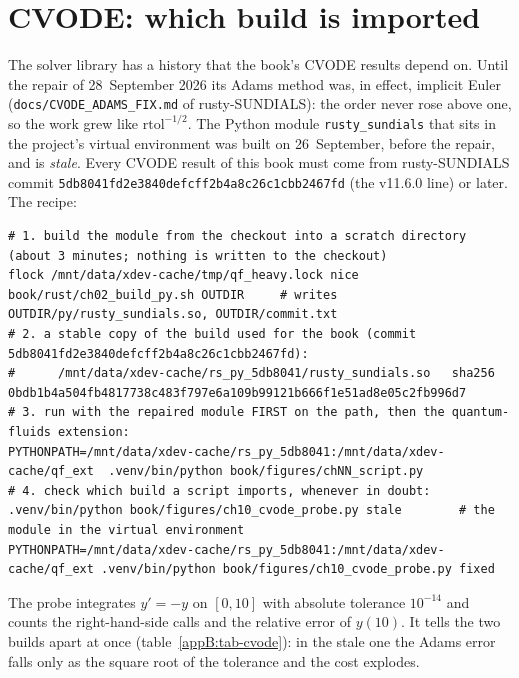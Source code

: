 \section{CVODE: which build is imported}\label{appB:cvode}
The solver library has a history that the book's CVODE results depend on. Until the repair of 28~September 2026 its Adams method was, in effect, implicit Euler (\texttt{docs/\allowbreak{}CVODE\_\allowbreak{}ADAMS\_\allowbreak{}FIX.\allowbreak{}md} of rusty-SUNDIALS): the order never rose above one, so the work grew like $\mathrm{rtol}^{-1/2}$. The Python module \texttt{rusty\_\allowbreak{}sundials} that sits in the project's virtual environment was built on 26~September, before the repair, and is \emph{stale}. Every CVODE result of this book must come from rusty-SUNDIALS commit \texttt{5db8041fd2e3840defcff2b4a8c26c1cbb2467fd} (the v11.6.0 line) or later. The recipe:
\begin{lstlisting}[style=plainmono]
# 1. build the module from the checkout into a scratch directory (about 3 minutes; nothing is written to the checkout)
flock /mnt/data/xdev-cache/tmp/qf_heavy.lock nice book/rust/ch02_build_py.sh OUTDIR     # writes OUTDIR/py/rusty_sundials.so, OUTDIR/commit.txt
# 2. a stable copy of the build used for the book (commit 5db8041fd2e3840defcff2b4a8c26c1cbb2467fd):
#      /mnt/data/xdev-cache/rs_py_5db8041/rusty_sundials.so   sha256 0bdb1b4a504fb4817738c483f797e6a109b99121b666f1e51ad8e05c2fb996d7
# 3. run with the repaired module FIRST on the path, then the quantum-fluids extension:
PYTHONPATH=/mnt/data/xdev-cache/rs_py_5db8041:/mnt/data/xdev-cache/qf_ext  .venv/bin/python book/figures/chNN_script.py
# 4. check which build a script imports, whenever in doubt:
.venv/bin/python book/figures/ch10_cvode_probe.py stale        # the module in the virtual environment
PYTHONPATH=/mnt/data/xdev-cache/rs_py_5db8041:/mnt/data/xdev-cache/qf_ext .venv/bin/python book/figures/ch10_cvode_probe.py fixed
\end{lstlisting}
The probe integrates $y'=-y$ on $[0,10]$ with absolute tolerance $10^{-14}$ and counts the right-hand-side calls and the relative error of $y(10)$. It tells the two builds apart at once (table~\ref{appB:tab-cvode}): in the stale one the Adams error falls only as the square root of the tolerance and the cost explodes.
